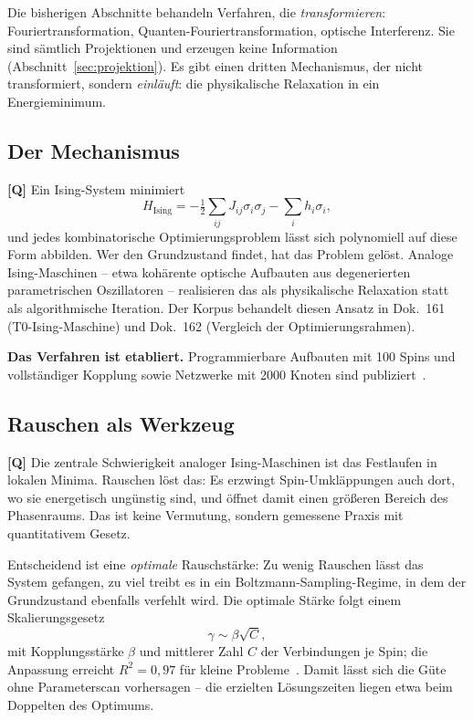 Die bisherigen Abschnitte behandeln Verfahren, die \emph{transformieren}:
Fouriertransformation, Quanten-Fouriertransformation, optische Interferenz.
Sie sind s\"amtlich Projektionen und erzeugen keine Information
(Abschnitt~\ref{sec:projektion}). Es gibt einen dritten Mechanismus, der
nicht transformiert, sondern \emph{einl\"auft}: die physikalische
Relaxation in ein Energieminimum.

\subsection{Der Mechanismus}

\textbf{[Q]} Ein Ising-System minimiert
\begin{equation}
  H_{\text{Ising}} = -\tfrac12 \sum_{ij} J_{ij}\sigma_i\sigma_j
  - \sum_i h_i \sigma_i ,
\end{equation}
und jedes kombinatorische Optimierungsproblem l\"asst sich polynomiell auf
diese Form abbilden. Wer den Grundzustand findet, hat das Problem gel\"ost.
Analoge Ising-Maschinen -- etwa koh\"arente optische Aufbauten aus
degenerierten parametrischen Oszillatoren -- realisieren das als
physikalische Relaxation statt als algorithmische Iteration. Der Korpus
behandelt diesen Ansatz in Dok.~161 (T0-Ising-Maschine) und Dok.~162
(Vergleich der Optimierungsrahmen).

\textbf{Das Verfahren ist etabliert.} Programmierbare Aufbauten mit 100
Spins und vollst\"andiger Kopplung sowie Netzwerke mit 2000 Knoten sind
publiziert~\cite{mcmahon2016, inagaki2016}.

\subsection{Rauschen als Werkzeug}

\textbf{[Q]} Die zentrale Schwierigkeit analoger Ising-Maschinen ist das
Festlaufen in lokalen Minima. Rauschen l\"ost das: Es erzwingt
Spin-Umkl\"appungen auch dort, wo sie energetisch ung\"unstig sind, und
\"offnet damit einen gr\"o\ss eren Bereich des Phasenraums. Das ist keine
Vermutung, sondern gemessene Praxis mit quantitativem Gesetz.

Entscheidend ist eine \emph{optimale} Rauschst\"arke: Zu wenig Rauschen
l\"asst das System gefangen, zu viel treibt es in ein
Boltzmann-Sampling-Regime, in dem der Grundzustand ebenfalls verfehlt
wird. Die optimale St\"arke folgt einem Skalierungsgesetz
\begin{equation}
  \gamma \sim \beta \sqrt{C},
\end{equation}
mit Kopplungsst\"arke $\beta$ und mittlerer Zahl $C$ der Verbindungen je
Spin; die Anpassung erreicht $R^2 = 0{,}97$ f\"ur kleine
Probleme~\cite{mys2025}. Damit l\"asst sich die G\"ute ohne Parameterscan
vorhersagen -- die erzielten L\"osungszeiten liegen etwa beim Doppelten
des Optimums.

